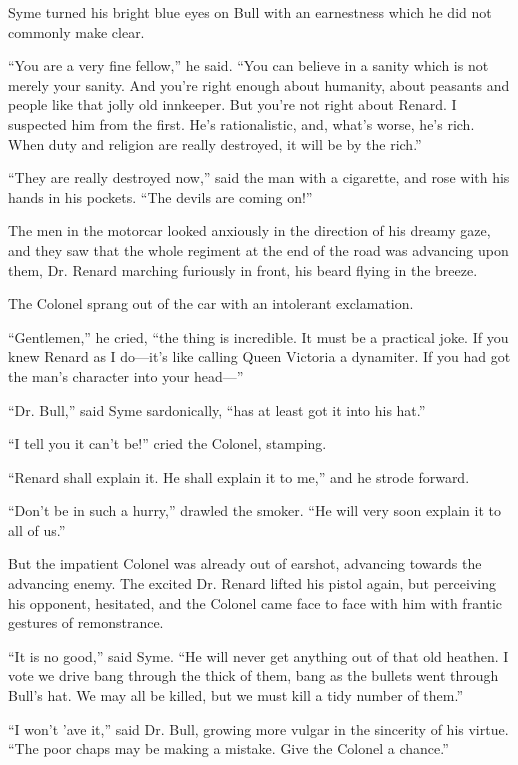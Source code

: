 Syme turned his bright blue eyes on Bull with an earnestness which he did not commonly make clear.

“You are a very fine fellow,” he said. “You can believe in a sanity which is not merely your sanity. And you’re right enough about humanity, about peasants and people like that jolly old innkeeper. But you’re not right about Renard. I suspected him from the first. He’s rationalistic, and, what’s worse, he’s rich. When duty and religion are really destroyed, it will be by the rich.”

“They are really destroyed now,” said the man with a cigarette, and rose with his hands in his pockets. “The devils are coming on!”

The men in the motorcar looked anxiously in the direction of his dreamy gaze, and they saw that the whole regiment at the end of the road was advancing upon them, Dr. Renard marching furiously in front, his beard flying in the breeze.

The Colonel sprang out of the car with an intolerant exclamation.

“Gentlemen,” he cried, “the thing is incredible. It must be a practical joke. If you knew Renard as I do⁠—it’s like calling Queen Victoria a dynamiter. If you had got the man’s character into your head⁠—”

“Dr. Bull,” said Syme sardonically, “has at least got it into his hat.”

“I tell you it can’t be!” cried the Colonel, stamping.

“Renard shall explain it. He shall explain it to me,” and he strode forward.

“Don’t be in such a hurry,” drawled the smoker. “He will very soon explain it to all of us.”

But the impatient Colonel was already out of earshot, advancing towards the advancing enemy. The excited Dr. Renard lifted his pistol again, but perceiving his opponent, hesitated, and the Colonel came face to face with him with frantic gestures of remonstrance.

“It is no good,” said Syme. “He will never get anything out of that old heathen. I vote we drive bang through the thick of them, bang as the bullets went through Bull’s hat. We may all be killed, but we must kill a tidy number of them.”

“I won’t ’ave it,” said Dr. Bull, growing more vulgar in the sincerity of his virtue. “The poor chaps may be making a mistake. Give the Colonel a chance.”

